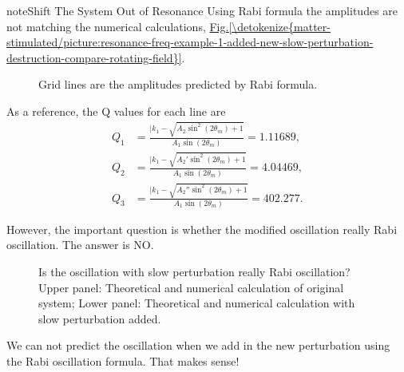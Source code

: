 \documentclass[letterpaper,12pt,english]{sphinxmanual}
\begin{document}
\begin{sphinxadmonition}{note}{Shift The System Out of Resonance}
Using Rabi formula the amplitudes are not matching the numerical calculations, \hyperref[\detokenize{matter-stimulated/picture:resonance-freq-example-1-added-new-slow-perturbation-destruction-compare-rotating-field}]{Fig.\@ \ref{\detokenize{matter-stimulated/picture:resonance-freq-example-1-added-new-slow-perturbation-destruction-compare-rotating-field}}}.
\begin{figure}[htbp]
\centering
\capstart

\noindent{}
\caption{Grid lines are the amplitudes predicted by Rabi formula.}\label{\detokenize{matter-stimulated/picture:resonance-freq-example-1-added-new-slow-perturbation-destruction-compare-rotating-field}}\label{\detokenize{matter-stimulated/picture:id10}}\end{figure}

As a reference, the Q values for each line are
\begin{equation*}
\begin{split}Q_1 & =  \frac{\lvert k_1 - \sqrt{A_2 \sin^2(2\theta_m)  + 1 }  }{A_1\sin (2\theta_m)} = 1.11689, \\
Q_2 & = \frac{\lvert k_1 - \sqrt{A_2' \sin^2(2\theta_m)  + 1 }  }{A_1\sin (2\theta_m)} = 4.04469, \\
Q_3 & = \frac{\lvert k_1 - \sqrt{A_2'' \sin^2(2\theta_m)  + 1 }  }{A_1\sin (2\theta_m)} = 402.277.\end{split}
\end{equation*}\end{sphinxadmonition}

However, the important question is whether the modified oscillation really Rabi oscillation. The answer is NO.
\begin{figure}[htbp]
\centering
\capstart

\noindent{}
\caption{Is the oscillation with slow perturbation really Rabi oscillation? Upper panel: Theoretical and numerical calculation of original system;
Lower panel: Theoretical and numerical calculation with slow perturbation added.}\label{\detokenize{matter-stimulated/picture:id11}}\end{figure}

We can not predict the oscillation when we add in the new perturbation using the Rabi oscillation formula. That makes sense!
\end{document}
